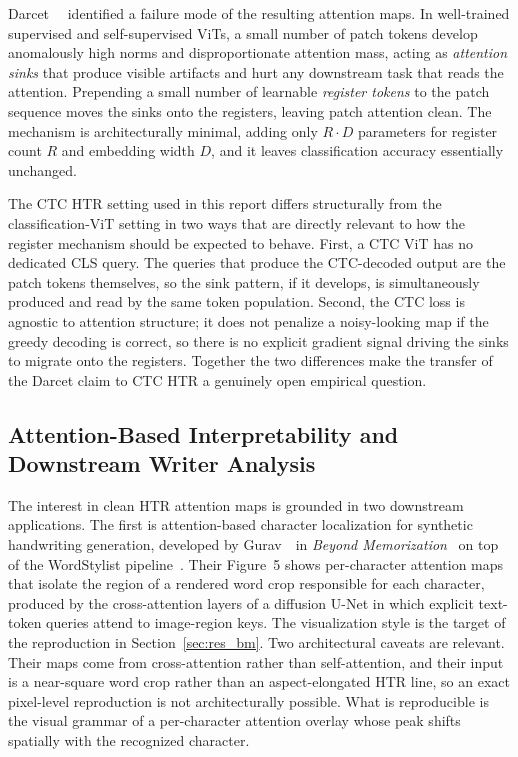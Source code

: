 Darcet~\etal~\cite{darcet2024registers} identified a failure mode of the resulting attention maps. In well-trained supervised and self-supervised ViTs, a small number of patch tokens develop anomalously high norms and disproportionate attention mass, acting as \emph{attention sinks} that produce visible artifacts and hurt any downstream task that reads the attention. Prepending a small number of learnable \emph{register tokens} to the patch sequence moves the sinks onto the registers, leaving patch attention clean. The mechanism is architecturally minimal, adding only $R \cdot D$ parameters for register count $R$ and embedding width $D$, and it leaves classification accuracy essentially unchanged.

The CTC HTR setting used in this report differs structurally from the classification-ViT setting in two ways that are directly relevant to how the register mechanism should be expected to behave. First, a CTC ViT has no dedicated CLS query. The queries that produce the CTC-decoded output are the patch tokens themselves, so the sink pattern, if it develops, is simultaneously produced and read by the same token population. Second, the CTC loss is agnostic to attention structure; it does not penalize a noisy-looking map if the greedy decoding is correct, so there is no explicit gradient signal driving the sinks to migrate onto the registers. Together the two differences make the transfer of the Darcet claim to CTC HTR a genuinely open empirical question.

\subsection{Attention-Based Interpretability and Downstream Writer Analysis}
\label{sec:rw_interp}

The interest in clean HTR attention maps is grounded in two downstream applications. The first is attention-based character localization for synthetic handwriting generation, developed by Gurav~\etal\ in \emph{Beyond Memorization}~\cite{gurav2025beyondmem} on top of the WordStylist pipeline~\cite{nikolaidou2023wordstylist}. Their Figure~5 shows per-character attention maps that isolate the region of a rendered word crop responsible for each character, produced by the cross-attention layers of a diffusion U-Net in which explicit text-token queries attend to image-region keys. The visualization style is the target of the reproduction in Section~\ref{sec:res_bm}. Two architectural caveats are relevant. Their maps come from cross-attention rather than self-attention, and their input is a near-square word crop rather than an aspect-elongated HTR line, so an exact pixel-level reproduction is not architecturally possible. What is reproducible is the visual grammar of a per-character attention overlay whose peak shifts spatially with the recognized character.

